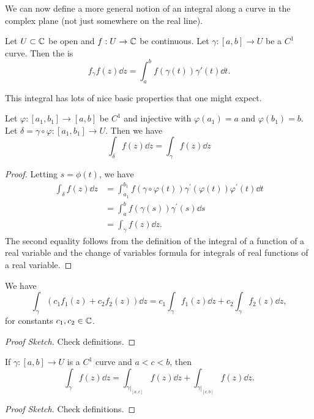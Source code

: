 \documentclass[a4paper]{scrartcl}
\begin{document}
We can now define a more general notion of an integral along a curve in the complex plane (not just somewhere on the real line).

\begin{definition}
    Let $U \subset \mathbb{C}$ be open and $f: U \rightarrow \mathbb{C}$ be continuous. Let $\gamma: [a, b]  \rightarrow U$ be a $C^1$ curve. Then the  is
    $$
    f_{\gamma} f(z) \dd z = \int_a^b f(\gamma(t)) \gamma'(t) \dd t.
    $$
\end{definition}

This integral has lots of nice basic properties that one might expect.

\begin{proposition}
Let $\varphi:\left[a_{1}, b_{1}\right] \rightarrow[a, b]$ be $C^{1}$ and injective with $\varphi\left(a_{1}\right)=a$ and $\varphi\left(b_{1}\right)=b$. Let
$\delta=\gamma \circ \varphi:\left[a_{1}, b_{1}\right] \rightarrow U$. Then we have
$$
\int_{\delta} f(z) \dd z=\int_{\gamma} f(z) \dd z
$$
\end{proposition}
\begin{proof}
    Letting $s = \phi(t)$, we have
    \begin{align*}
\int_{\delta} f(z) \dd z&=\int_{a_{1}}^{b_{1}} f(\gamma \circ \varphi(t)) \gamma^{\prime}(\varphi(t)) \varphi^{\prime}(t) \dd t \\
&= \int_{a}^{b} f(\gamma(s)) \gamma^{\prime}(s) \dd s \\ &=\int_{\gamma} f(z) \dd z.
    \end{align*}
    The second equality follows from the definition of the integral of a function of a real variable and the change of variables formula for integrals of real functions of a real variable.
\end{proof}

\begin{proposition}[Linearity]
    We have
    $$
    \int_{\gamma}\left(c_{1} f_{1}(z)+c_{2} f_{2}(z)\right) \dd z=c_{1} \int_{\gamma} f_{1}(z) \dd z+c_{2} \int_{\gamma} f_{2}(z) \dd z,
    $$
    for constants $c_1, c_2 \in \mathbb{C}$.
\end{proposition}
\begin{proof}[Proof Sketch]    
    Check definitions.
\end{proof}

\begin{proposition}[Additivity]
    If $\gamma:[a, b] \rightarrow U$ is a $C^{1}$ curve and $a<c<b$, then 
    $$\int_{\gamma} f(z) \dd z=\int_{\left.\gamma\right|_{[a, c]}} f(z) \dd z+\int_{\left.\gamma\right|_{[c, b]}} f(z) \dd z .
    $$
\end{proposition}
\begin{proof}[Proof Sketch]    
    Check definitions.
\end{proof}
\end{document}
